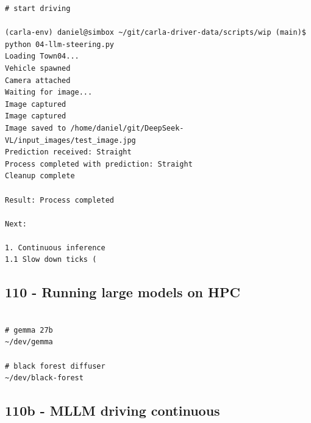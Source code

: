 \begin{verbatim}
# start driving

(carla-env) daniel@simbox ~/git/carla-driver-data/scripts/wip (main)$ python 04-llm-steering.py 
Loading Town04...
Vehicle spawned
Camera attached
Waiting for image...
Image captured
Image captured
Image saved to /home/daniel/git/DeepSeek-VL/input_images/test_image.jpg
Prediction received: Straight
Process completed with prediction: Straight
Cleanup complete

Result: Process completed

Next:

1. Continuous inference
1.1 Slow down ticks (

\end{verbatim}

\subsection{110 - Running large models on HPC}
\label{app_res:110}

\begin{verbatim}

# gemma 27b
~/dev/gemma

# black forest diffuser
~/dev/black-forest

\end{verbatim}

\subsection{110b - MLLM driving continuous}
\label{app_res:110}

